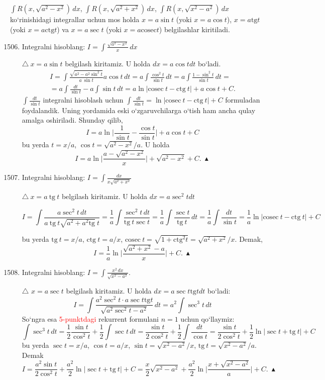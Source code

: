 $\int R(x, \sqrt{a^2-x^2})\,dx$, $\int R(x, \sqrt{a^2+x^2})\,dx$, $\int R(x, \sqrt{x^2-a^2})\,dx$ ko`rinishidagi integrallar  uchun mos holda $x=a\sin t$ (yoki $x=a\cos t$), $x=a\textrm{tg}t$ (yoki $x=a\textrm{ctg}t$) va $x=a\sec t$ (yoki $x=a\textrm{cosec}t$) belgilashlar kiritiladi.

\begin{enumerate}\setcounter{enumi}{1505}
	\item Integralni hisoblang: $I=\int\frac{\sqrt{a^2-x^2}}{x}\,dx$
	
	$\triangle\ x=a\sin t$ belgilash kiritamiz. U holda $dx=a\cos tdt$ bo`ladi. 
	\begin{multline*}
		I=\int\frac{\sqrt{a^2-a^2\sin^2t}}{a\ \sin t}a\cos t\,dt=a\int\frac{\cos^2t}{\sin t}\,dt=a\int\frac{1-\sin^2t}{\sin t}\,dt=\\
		=a\int\frac{dt}{\sin t}-a\int\sin t\,dt=a\ln|\textrm{cosec}\ t-\textrm{ctg}\ t|+a\cos t+C.
	\end{multline*}
	$\int\frac{dt}{\sin t}$ integralni hisoblash uchun $\int\frac{dt}{\sin t}=\ln|\textrm{cosec}\ t-\textrm{ctg}\ t|+C$ formuladan foydalandik. Uning yordamida eski o`zgaruvchilarga o`tish ham ancha qulay amalga oshiriladi. Shunday qilib,
	$$I=a\ln\bigg|\frac{1}{\sin t}-\frac{\cos t}{\sin t}\bigg|+a\cos t+C$$
	bu yerda $t=x/a$, $\cos t=\sqrt{a^2-x^2}/a$. U holda
	$$I=a\ln\bigg|\frac{a-\sqrt{a^2-x^2}}{x}\bigg|+\sqrt{a^2-x^2}+C.\ \blacktriangle$$
	
	\item Integralni hisoblang: $I=\int\frac{dx}{x\sqrt{a^2+x^2}}$
	
	$\triangle\  x=a\ \textrm{tg}\ t$ belgilash kiritamiz. U holda $dx=a\sec^2tdt$
	
	$$I=\int\frac{a\sec^{2}t\,dt}{a\ \textrm{tg}\ t\sqrt{a^2+a^2\textrm{tg}}\ t}=
		\frac{1}{a}\int\frac{\sec^2t\,dt}{\textrm{tg}\ t\sec t}=
		\frac{1}{a}\int\frac{\sec t}{\textrm{tg}\ t}\,dt=
		\frac{1}{a}\int\frac{dt}{\sin t}=
		\frac{1}{a}\ln|\textrm{cosec}\ t-\textrm{ctg}\ t|+C$$
		
	bu yerda $\textrm{tg}\ t=x/a$, $\textrm{ctg}\ t=a/x$, $\textrm{cosec}\ t=\sqrt{1+\textrm{ctg}^2t}=\sqrt{a^2+x^2}/x$.
	Demak,
	$$I=\frac{1}{a}\ln\bigg|\frac{\sqrt{a^2+x^2}-a}{x}\bigg|+C.\ \blacktriangle$$
	
	
	\item Integralni hisoblang: $I=\int\frac{x^2\,dx}{\sqrt{x^2-a^2}}$.
	
	$\triangle$ $x=a\sec t$ belgilash kiritamiz. U holda $dx=a\sec t\textrm{tg}tdt$ bo`ladi:
	$$I=\int\frac{a^2\sec^2t\cdot a\sec t\textrm{tg}t}{\sqrt{a^2\sec^2t-a^2}}\,dt=a^2\int\sec^3t\,dt$$
	So`ngra esa \textcolor{red}{5-punktdagi} rekurrent formulani $n=1$ uchun qo`llaymiz:
	$$\int\sec^3t\,dt=\frac{1}{2}\frac{\sin t}{\cos^2t}+\frac{1}{2}\int\sec t\,dt=\frac{\sin t}{2\cos^2t}+\frac{1}{2}\int\frac{dt}{\cos t}=\frac{\sin t}{2\cos^2t}+\frac{1}{2}\ln|\sec t+\textrm{tg}\ t|+C$$
	bu yerda $\sec t=x/a$, $\cos t=a/x$, $\sin t=\sqrt{x^2-a^2}/x$, $\textrm{tg}\ t=\sqrt{x^2-a^2}/a$. Demak
	$$I=\frac{a^2\sin t}{2\cos^2t}+\frac{a^2}{2}\ln|\sec t+\textrm{tg}\ t|+C=\frac{x}{2}\sqrt{x^2-a^2}+\frac{a^2}{2}\ln\bigg|\frac{x+\sqrt{x^2-a^2}}{a}\bigg|+C.\ \blacktriangle$$
\end{enumerate}



